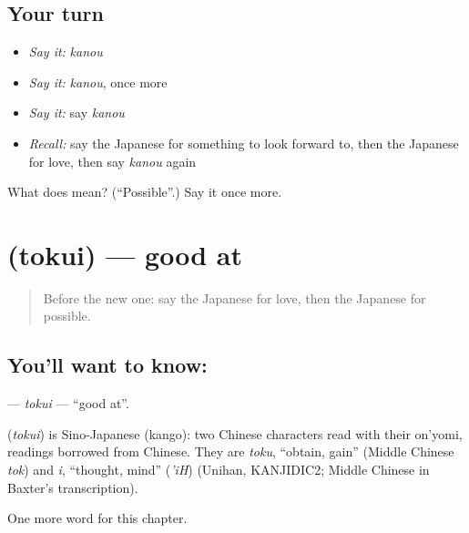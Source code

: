\subsection*{Your turn}
\begin{itemize}
\raggedright
  \item \emph{Say it:} \emph{kanou}
  \item \emph{Say it:} \emph{kanou}, once more
  \item \emph{Say it:} say \emph{kanou}
  \item \emph{Recall:} say the Japanese for something to look forward to, then the Japanese for love, then say \emph{kanou} again
\end{itemize}

\begin{tcolorbox}[breakable,colback=teal!4,colframe=teal!35!black,title={Before you move on}]
What does  mean? (\textquotedblleft{}Possible\textquotedblright{}.) Say it once more.
\end{tcolorbox}
\section[\texorpdfstring{\ja{とくい} (tokui)}{とくい (tokui)}]{ (tokui) — good at}

\label{lesson:JA-C95-tokui}



\begin{quote}
Before the new one: say the Japanese for love, then the Japanese for possible.
\end{quote}

\subsection*{You'll want to know: }
\textbf{} — \emph{tokui} — \textquotedblleft{}good at\textquotedblright{}.

\begin{cousinweb}
\textbf{} (\emph{tokui}) is Sino-Japanese (kango): two Chinese characters read with their on'yomi, readings borrowed from Chinese. They are \emph{toku}, \textquotedblleft{}obtain, gain\textquotedblright{} (Middle Chinese \emph{tok}) and \emph{i}, \textquotedblleft{}thought, mind\textquotedblright{} (\emph{'iH}) (Unihan, KANJIDIC2; Middle Chinese in Baxter's transcription).
\end{cousinweb}

\begin{grammarlens}[title={What you've built}]
One more word for this chapter.
\end{grammarlens}

